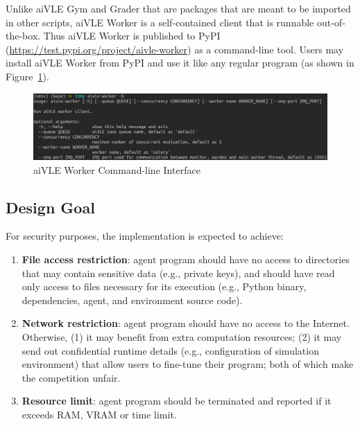 Unlike aiVLE Gym and Grader that are packages that are meant to be imported in other scripts, aiVLE Worker is a self-contained client that is runnable out-of-the-box. Thus aiVLE Worker is published to PyPI (\href{https://test.pypi.org/project/aivle-worker}{https://test.pypi.org/project/aivle-worker})  as a command-line tool. Users may install aiVLE Worker from PyPI and use it like any regular program (as shown in Figure~\ref{fig:aivle-worker-cli}).

\begin{figure}[H]
    \centering
    \includegraphics[width=\textwidth]{images/aivle-worker-cli.png}
    \caption{aiVLE Worker Command-line Interface}
    \label{fig:aivle-worker-cli}
\end{figure}

\subsection{Design Goal}
\label{ss:aivle-worker-design-goal}
For security purposes, the implementation is expected to achieve:
\begin{enumerate}
    \item \textbf{File access restriction}: agent program should have no access to directories that may contain sensitive data (e.g., private keys), and should have read only access to files necessary for its execution (e.g., Python binary, dependencies, agent, and environment source code).
    \item \textbf{Network restriction}: agent program should have no access to the Internet. Otherwise, (1) it may benefit from extra computation resources; (2) it may send out confidential runtime details (e.g., configuration of simulation environment) that allow users to fine-tune their program; both of which make the competition unfair.
    \item \textbf{Resource limit}: agent program should be terminated and reported if it exceeds RAM, VRAM or time limit.
\end{enumerate}

